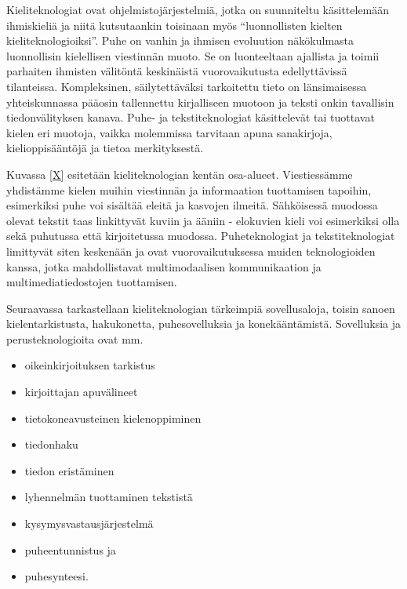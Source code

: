 \documentclass[]{../../metanetpaper}
\begin{document}
\begin{multicols}{2}
Kieliteknologiat ovat ohjelmistojärjestelmiä, jotka on suunniteltu
käsittelemään ihmiskieliä ja niitä kutsutaankin toisinaan myös
“luonnollisten kielten kieliteknologioiksi”. Puhe on vanhin ja ihmisen 
evoluution näkökulmasta luonnollisin kielellisen viestinnän muoto. Se on 
luonteeltaan ajallista ja toimii parhaiten 
ihmisten välitöntä keskinäistä vuorovaikutusta edellyttävissä tilanteissa. 
Kompleksinen, säilytettäväksi tarkoitettu tieto on länsimaisessa yhteiskunnassa
pääosin tallennettu kirjalliseen muotoon ja teksti onkin tavallisin
tiedonvälityksen kanava. Puhe- ja tekstiteknologiat käsittelevät tai
tuottavat kielen eri muotoja, vaikka molemmissa tarvitaan apuna
sanakirjoja, kielioppisääntöjä ja tietoa merkityksestä.

Kuvassa \ref{X} esitetään kieliteknologian kentän
osa-alueet.  Viestiessämme yhdistämme kielen muihin viestinnän ja
informaation tuottamisen tapoihin, esimerkiksi puhe voi sisältää
eleitä ja kasvojen ilmeitä. Sähköisessä muodossa olevat tekstit taas
linkittyvät kuviin ja ääniin - elokuvien kieli voi esimerkiksi olla
sekä puhutussa että kirjoitetussa muodossa. Puheteknologiat ja
tekstiteknologiat limittyvät siten keskenään ja ovat
vuorovaikutuksessa muiden teknologioiden kanssa, jotka mahdollistavat
multimodaalisen kommunikaation ja multimediatiedostojen tuottamisen.

Seuraavassa tarkastellaan kieliteknologian tärkeimpiä sovellusaloja,
toisin sanoen kielentarkistusta, hakukonetta, puhesovelluksia ja
konekääntämistä.  Sovelluksia ja perusteknologioita ovat mm.
\begin{itemize}
\item oikeinkirjoituksen tarkistus

\item kirjoittajan apuvälineet

\item tietokoneavusteinen kielenoppiminen

\item tiedonhaku

\item tiedon eristäminen

\item lyhennelmän tuottaminen tekstistä

\item kysymysvastausjärjestelmä

\item puheentunnistus ja

\item puhesynteesi.
\end{itemize}


\end{multicols}
\end{document}
